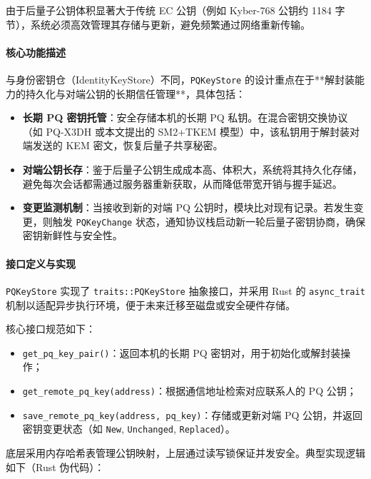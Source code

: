 \begin{itemize}
    由于后量子公钥体积显著大于传统 EC 公钥（例如 Kyber-768 公钥约 1184 字节），系统必须高效管理其存储与更新，避免频繁通过网络重新传输。
    
    \paragraph{核心功能描述}
    \label{subsec:pq_functionality}
    与身份密钥仓（IdentityKeyStore）不同，\texttt{PQKeyStore} 的设计重点在于**解封装能力的持久化与对端公钥的长期信任管理**，具体包括：
    
    \begin{itemize}
        \item \textbf{长期 PQ 密钥托管}：安全存储本机的长期 PQ 私钥。在混合密钥交换协议（如 PQ-X3DH 或本文提出的 SM2+TKEM 模型）中，该私钥用于解封装对端发送的 KEM 密文，恢复后量子共享秘密。
        
        \item \textbf{对端公钥长存}：鉴于后量子公钥生成成本高、体积大，系统将其持久化存储，避免每次会话都需通过服务器重新获取，从而降低带宽开销与握手延迟。
        
        \item \textbf{变更监测机制}：当接收到新的对端 PQ 公钥时，模块比对现有记录。若发生变更，则触发 \texttt{PQKeyChange} 状态，通知协议栈启动新一轮后量子密钥协商，确保密钥新鲜性与安全性。
    \end{itemize}
    
    \paragraph{接口定义与实现}
    \label{subsec:pq_interface}
    \texttt{PQKeyStore} 实现了 \texttt{traits::PQKeyStore} 抽象接口，并采用 Rust 的 \texttt{async\_trait} 机制以适配异步执行环境，便于未来迁移至磁盘或安全硬件存储。
    
    核心接口规范如下：
    \begin{itemize}
        \item \texttt{get\_pq\_key\_pair()}：返回本机的长期 PQ 密钥对，用于初始化或解封装操作；
        \item \texttt{get\_remote\_pq\_key(address)}：根据通信地址检索对应联系人的 PQ 公钥；
        \item \texttt{save\_remote\_pq\_key(address, pq\_key)}：存储或更新对端 PQ 公钥，并返回密钥变更状态（如 \texttt{New}, \texttt{Unchanged}, \texttt{Replaced}）。
    \end{itemize}
    
    底层采用内存哈希表管理公钥映射，上层通过读写锁保证并发安全。典型实现逻辑如下（Rust 伪代码）：
    

\end{itemize}
